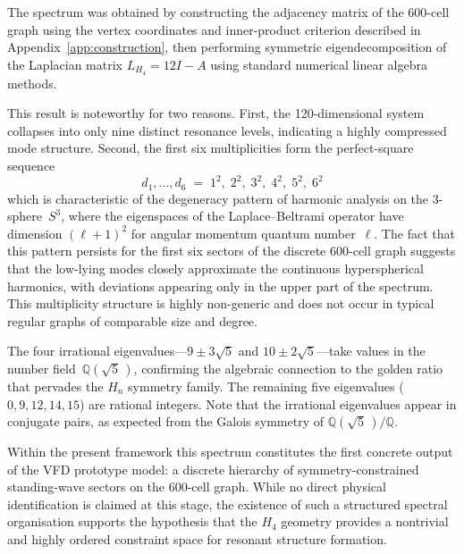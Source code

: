 \documentclass[12pt,a4paper]{article}
\newcommand{\Hfour}{H_4}
\newcommand{\Lmat}{L_{H_4}}
\newcommand{\Q}{\mathbb{Q}}
\begin{document}
The spectrum was obtained by constructing the adjacency matrix of the
600-cell graph using the vertex coordinates and inner-product criterion
described in Appendix~\ref{app:construction}, then performing symmetric
eigendecomposition of the Laplacian matrix $\Lmat = 12I - A$ using standard
numerical linear algebra methods.

This result is noteworthy for two reasons.  First, the 120-dimensional system
collapses into only nine distinct resonance levels, indicating a highly
compressed mode structure.  Second, the first six multiplicities form the
perfect-square sequence
\begin{equation}\label{eq:squares}
  d_1,\ldots,d_6 \;=\; 1^2,\; 2^2,\; 3^2,\; 4^2,\; 5^2,\; 6^2
\end{equation}
which is characteristic of the degeneracy pattern of harmonic analysis on
the 3-sphere~$S^3$, where the eigenspaces of the Laplace--Beltrami operator
have dimension $(\ell+1)^2$ for angular momentum quantum number~$\ell$.  The
fact that this pattern persists for the first six sectors of the discrete
600-cell graph suggests that the low-lying modes closely approximate the
continuous hyperspherical harmonics, with deviations appearing only in the
upper part of the spectrum.  This multiplicity structure is highly
non-generic and does not occur in typical regular graphs of comparable
size and degree.

The four irrational eigenvalues---$9 \pm 3\sqrt{5}$ and
$10 \pm 2\sqrt{5}$---take values in the number field~$\Q(\sqrt{5}\,)$,
confirming the algebraic connection to the golden ratio that pervades the
$H_n$ symmetry family.  The remaining five eigenvalues
($0, 9, 12, 14, 15$) are rational integers.  Note that the irrational
eigenvalues appear in conjugate pairs, as expected from the Galois symmetry of
$\Q(\sqrt{5}\,)/\Q$.

Within the present framework this spectrum constitutes the first concrete
output of the VFD prototype model: a discrete hierarchy of
symmetry-constrained standing-wave sectors on the 600-cell graph.  While no
direct physical identification is claimed at this stage, the existence of such
a structured spectral organisation supports the hypothesis that the $\Hfour$
geometry provides a nontrivial and highly ordered constraint space for
resonant structure formation.
\end{document}

